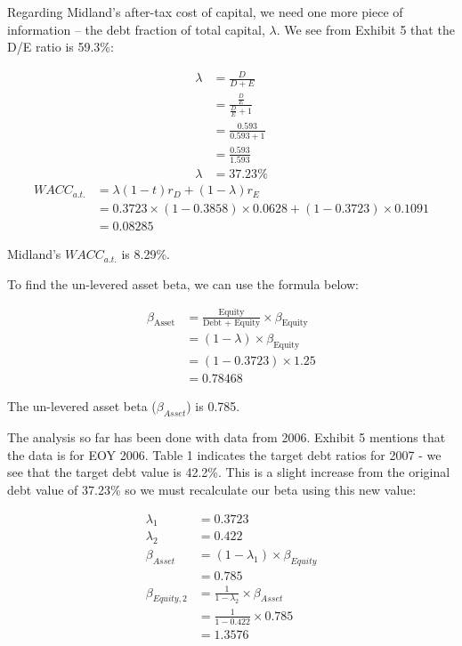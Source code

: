 \documentclass[letterpaper]{article}
\begin{document}
Regarding Midland's after-tax cost of capital, we need one more piece of information -- the debt fraction of total capital, $\lambda$. We see from Exhibit 5 that the D/E ratio is 59.3\%:

\begin{align*}
    \lambda &= \frac{D}{D+E} \\
            &= \frac{\frac{D}{E}}{\frac{D}{E} + 1} \\
            &= \frac{0.593}{0.593 + 1} \\
            &= \frac{0.593}{1.593} \\
    \lambda &= 37.23\%
\end{align*}
\begin{align*}
WACC_{a.t.} &= \lambda (1-t) r_D + (1-\lambda)r_E \\
            &= 0.3723 \times (1 - 0.3858) \times 0.0628 + (1 - 0.3723) \times 0.1091 \\
            &= 0.08285
\end{align*}

Midland's $WACC_{a.t.}$ is 8.29\%.

To find the un-levered asset beta, we can use the formula below:

\begin{align*}
\beta_{\text{Asset}} &= \frac{\text{Equity}}{\text{Debt + Equity}}\times \beta_{\text{Equity}} \\
                    &= (1 - \lambda) \times \beta_{\text{Equity}} \\
                    &= (1 - 0.3723) \times 1.25 \\
                    &= 0.78468
\end{align*}

The un-levered asset beta ($\beta_{Asset}$) is 0.785.

The analysis so far has been done with data from 2006. Exhibit 5 mentions that the data is for EOY 2006. Table 1 indicates the target debt ratios for 2007 - we see that the target debt value is 42.2\%. This is a slight increase from the original debt value of 37.23\% so we must recalculate our beta using this new value:

\begin{align*}
\lambda_{1} &= 0.3723 \\
\lambda_{2} &= 0.422  \\
\beta_{Asset} &= (1 - \lambda_{1}) \times \beta_{Equity} \\
            &= 0.785 \\
\beta_{Equity,2} &= \frac{1}{1-\lambda_{2}} \times \beta_{Asset} \\
                &= \frac{1}{1-0.422} \times 0.785 \\
                &= 1.3576
\end{align*}
\end{document}
